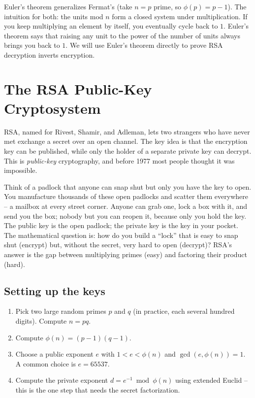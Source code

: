 Euler's theorem generalizes Fermat's (take $n = p$ prime, so $\phi(p) = p-1$).
The intuition for both: the units mod $n$ form a closed system under multiplication. If you keep multiplying an element by itself, you eventually cycle back to $1$. Euler's theorem says that raising any unit to the power of the number of units always brings you back to $1$. We will use Euler's theorem directly to
prove RSA decryption inverts encryption.

\section{The RSA Public-Key Cryptosystem}
\label{ch30:rsa}

RSA, named for Rivest, Shamir,
and Adleman, lets two strangers who have never met exchange a secret over an open
channel. The key idea is that the encryption key can be published,
while only the holder of a separate private key can
decrypt. This is \emph{public-key} cryptography, and before 1977 most people
thought it was impossible.

\begin{intuitionbox}
Think of a padlock that anyone can snap shut but only you have the key to open.
You manufacture thousands of these open padlocks and scatter them everywhere -- a
mailbox at every street corner. Anyone can grab one, lock a box with it, and send
you the box; nobody but you can reopen it, because only you hold the key. The
public key is the open padlock; the private key is the key in your pocket. The
mathematical question is: how do you build a ``lock'' that is easy to snap shut
(encrypt) but, without the secret, very hard to open (decrypt)? RSA's answer
is the gap between multiplying primes (easy) and factoring their product (hard).
\end{intuitionbox}

\subsection{Setting up the keys}

\begin{enumerate}
  \item Pick two large random primes $p$ and $q$ (in practice, each several
        hundred digits). Compute $n = pq$.
  \item Compute $\phi(n) = (p-1)(q-1)$.
  \item Choose a public exponent $e$ with $1 < e < \phi(n)$ and $\gcd(e,
        \phi(n)) = 1$. A common choice is $e = 65537$.
  \item Compute the private exponent $d = e^{-1} \bmod \phi(n)$ using extended
        Euclid -- this is the one step that needs the secret factorization.
\end{enumerate}

